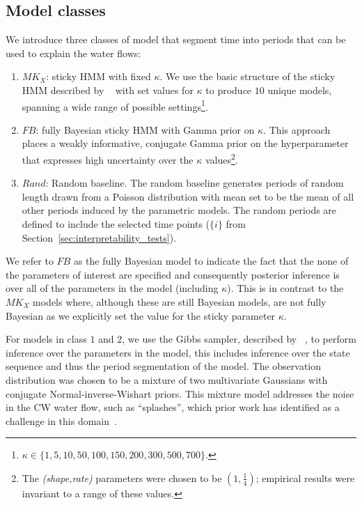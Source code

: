 \documentclass[letterpaper]{article}
\newcommand{\citename}[1]{\citeauthor{#1}~\shortcite{#1}}
\begin{document}
\subsection{Model classes}
We introduce three classes of model that segment time into periods that can be used to explain the water flows:

\begin{enumerate}
\item  {${MK_X}$: sticky HMM with fixed $\kappa$.} We use the basic structure of the sticky HMM described by \citename{fox2008hdp} with set values for $\kappa$ to produce $10$ unique models, spanning a wide range of possible settings\footnote{$\kappa \in \{1, 5, 10, 50, 100, 150, 200, 300, 500, 700\}$.}.
\item  {${FB}$: fully Bayesian sticky HMM with Gamma prior on $\kappa$.} This  approach places a weakly informative, conjugate Gamma prior on the hyperparameter that expresses high uncertainty over the $\kappa$ values\footnote{The \textit{(shape,rate)} parameters were chosen to be $(1,\frac{1}{4})$; empirical results were invariant to a range of these values.}.
\item  {${Rand}$: Random baseline.} The random baseline generates periods of random length drawn from a Poisson distribution with mean set to be the mean of all other periods induced by the parametric models. The random periods are defined to include the selected time points ($\{i\}$ from Section~\ref{sec:interpretability_tests}).
\end{enumerate}

\noindent We refer to ${FB}$ as the fully Bayesian model to indicate the fact that the none of the parameters of interest are specified and consequently posterior inference is over all of the parameters in the model (including $\kappa$). This is in contrast to the ${MK_X}$ models where, although these are still Bayesian models, are not fully Bayesian as we explicitly set the value for the sticky parameter $\kappa$.

For models in class $1$ and $2$, we use the Gibbs sampler, described by \citename{fox2008hdp}, to perform inference over the parameters in the model, this includes inference over the state sequence and thus the period segmentation of the model. The observation distribution was chosen to be a mixture of two multivariate Gaussians with conjugate Normal-inverse-Wishart priors. This mixture model addresses the noise in the CW water flow, such as ``splashes'', which prior work has identified as a challenge in this domain~\cite{hoernle2018modeling}.
\end{document}
